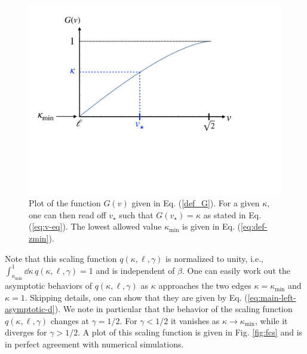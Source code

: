\documentclass[onecolumn,superscriptaddress,
 amsmath,amssymb,
 aps,
 prd,
]{revtex4-1}
\begin{document}
\begin{figure}[t]
\includegraphics[width = 0.55 \linewidth]{Fig_Gy.pdf}
\caption{Plot of the function $G(v)$ given in Eq. (\ref{def_G}). For a given $\kappa$, one can then read off $v_\star$ such that $G(v_\star) = \kappa$ as stated in Eq. (\ref{eq:v-eq}). The lowest allowed value $\kappa_{\min}$ is given in Eq. (\ref{eq:def-zmin}).}\label{Fig_G}
\end{figure}
%
%
%
%
%
%
Note that this scaling function $q(\kappa, \ell, \gamma)$ is normalized to unity, i.e., $\int_{\kappa_{\min}}^1 \dd \kappa \, q(\kappa, \ell, \gamma) = 1$ and is independent of $\beta$. One can easily work out the asymptotic behaviors of $q(\kappa, \ell, \gamma)$ as $\kappa$ approaches the two edges $\kappa = \kappa_{\min}$ and $\kappa = 1$. Skipping details, one can show that they are given by Eq. (\ref{eq:main-left-asymptotic-d}). We note in particular that the behavior of the scaling function 
$q(\kappa, \ell, \gamma)$ changes at $\gamma = 1/2$. For $\gamma < 1/2$ it vanishes as $\kappa \to \kappa_{\min}$, while it diverges for $\gamma > 1/2$.  
A plot of this scaling function is given in Fig. \ref{fig:fcs} and is in perfect agreement with numerical simulations. 
\end{document}
